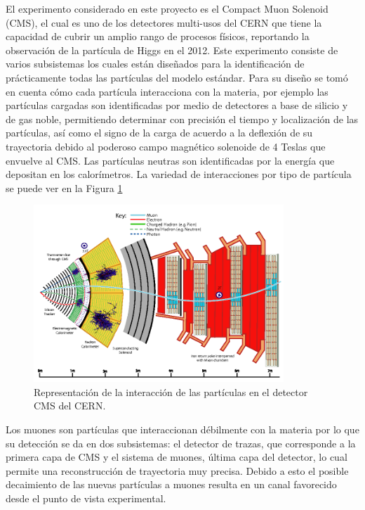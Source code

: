 El experimento considerado en este proyecto es el Compact Muon Solenoid (CMS), el cual es uno de los detectores multi-usos del CERN que tiene la capacidad de cubrir un amplio rango de procesos físicos, reportando la observación de la partícula de Higgs en el 2012. Este experimento consiste de varios subsistemas los cuales están diseñados para la identificación de prácticamente todas las partículas del modelo estándar. Para su diseño se tomó en cuenta cómo cada partícula interacciona con la materia, por ejemplo las partículas cargadas son identificadas por medio de detectores a base de silicio y de gas noble, permitiendo determinar con precisión el tiempo y localización de las partículas, así como el signo de la carga de acuerdo a la deflexión de su trayectoria debido al poderoso campo magnético solenoide de 4 Teslas que envuelve al CMS. Las partículas neutras son identificadas por la energía que depositan en los calorímetros. La variedad de interacciones por tipo de partícula se puede ver en la Figura \ref{fig:cms_interaction}

\begin{figure}
    \centering
    \includegraphics[width=0.84\textwidth]{ANTECEDENTES/CMS_interaction.png}
    \caption{Representación de la interacción de las partículas en el detector CMS del CERN.}
    \label{fig:cms_interaction}
\end{figure}

Los muones son partículas que interaccionan débilmente con la materia por lo que su detección se da en dos subsistemas: el detector de trazas, que corresponde a la primera capa de CMS y el sistema de muones, última capa del detector, lo cual permite una reconstrucción de trayectoria muy precisa. Debido a esto el posible decaimiento de las nuevas partículas a muones resulta en un canal favorecido desde el punto de vista experimental.

